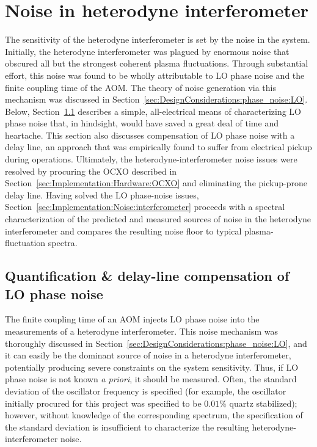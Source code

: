 \section{Noise in heterodyne interferometer}
\label{sec:Implementation:Noise}
The sensitivity of the heterodyne interferometer
is set by the noise in the system.
Initially, the heterodyne interferometer
was plagued by enormous noise that obscured
all but the strongest coherent plasma fluctuations.
Through substantial effort,
this noise was found to be wholly attributable to
LO phase noise and the finite coupling time of the AOM.
The theory of noise generation via this mechanism was discussed
in Section~\ref{sec:DesignConsiderations:phase_noise:LO}.
Below, Section~\ref{sec:Implementation:Noise:LO}
describes a simple, all-electrical means
of characterizing LO phase noise that, in hindsight,
would have saved a great deal of time and heartache.
This section also discusses compensation
of LO phase noise with a delay line,
an approach that was empirically found to suffer from electrical pickup
during \diiid\space operations.
Ultimately, the heterodyne-interferometer noise issues
were resolved by procuring the OCXO described in
Section~\ref{sec:Implementation:Hardware:OCXO} and
eliminating the pickup-prone delay line.
Having solved the LO phase-noise issues,
Section~\ref{sec:Implementation:Noise:interferometer}
proceeds with a spectral characterization
of the predicted and measured sources of noise
in the heterodyne interferometer and
compares the resulting noise floor
to typical plasma-fluctuation spectra.


\subsection{Quantification \& delay-line compensation of LO phase noise}
\label{sec:Implementation:Noise:LO}
The finite coupling time of an AOM injects LO phase noise
into the measurements of a heterodyne interferometer.
This noise mechanism was thoroughly discussed
in Section~\ref{sec:DesignConsiderations:phase_noise:LO}, and
it can easily be the dominant source of noise in a heterodyne interferometer,
potentially producing severe constraints on the system sensitivity.
Thus, if LO phase noise is not known \emph{a priori},
it should be measured.
Often, the standard deviation of the oscillator frequency is specified
(for example, the oscillator initially procured for this project
was specified to be $0.01\%$ quartz stabilized);
however, without knowledge of the corresponding spectrum,
the specification of the standard deviation
is insufficient to characterize the resulting
heterodyne-interferometer noise.

